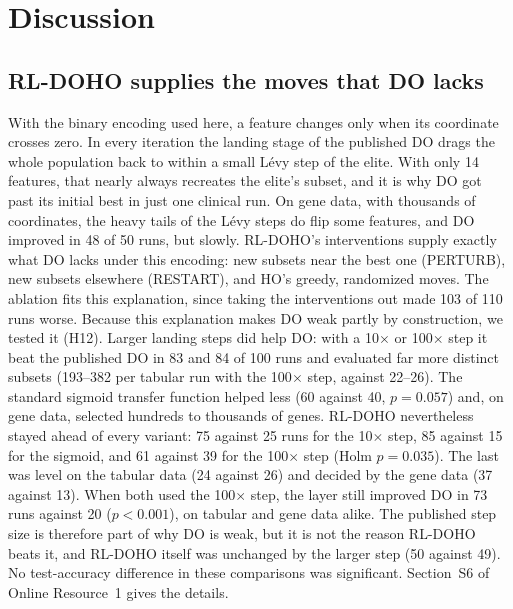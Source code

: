 \documentclass[pdflatex,sn-basic]{sn-jnl}
\begin{document}
\section{Discussion}\label{sec:discussion}

\subsection{RL-DOHO supplies the moves that DO lacks}
With the binary encoding used here, a feature changes only when its coordinate crosses zero. In every iteration the landing stage of the published DO drags the whole population back to within a small Lévy step of the elite. With only 14 features, that nearly always recreates the elite's subset, and it is why DO got past its initial best in just one clinical run. On gene data, with thousands of coordinates, the heavy tails of the Lévy steps do flip some features, and DO improved in 48 of 50 runs, but slowly. RL-DOHO's interventions supply exactly what DO lacks under this encoding: new subsets near the best one (PERTURB), new subsets elsewhere (RESTART), and HO's greedy, randomized moves. The ablation fits this explanation, since taking the interventions out made 103 of 110 runs worse. Because this explanation makes DO weak partly by construction, we tested it (H12). Larger landing steps did help DO: with a 10$\times$ or 100$\times$ step it beat the published DO in 83 and 84 of 100 runs and evaluated far more distinct subsets (193--382 per tabular run with the 100$\times$ step, against 22--26). The standard sigmoid transfer function helped less (60 against 40, $p=0.057$) and, on gene data, selected hundreds to thousands of genes. RL-DOHO nevertheless stayed ahead of every variant: 75 against 25 runs for the 10$\times$ step, 85 against 15 for the sigmoid, and 61 against 39 for the 100$\times$ step (Holm $p=0.035$). The last was level on the tabular data (24 against 26) and decided by the gene data (37 against 13). When both used the 100$\times$ step, the layer still improved DO in 73 runs against 20 ($p<0.001$), on tabular and gene data alike. The published step size is therefore part of why DO is weak, but it is not the reason RL-DOHO beats it, and RL-DOHO itself was unchanged by the larger step (50 against 49). No test-accuracy difference in these comparisons was significant. Section~S6 of Online Resource~1 gives the details.
\end{document}

